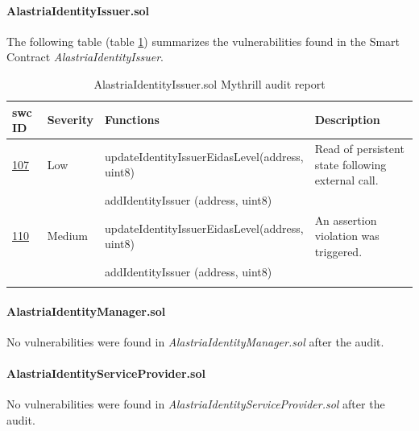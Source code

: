 \documentclass[a4paper, 12pt]{article} %
\begin{document}
            \paragraph{AlastriaIdentityIssuer.sol}
                The following table (table \ref{tab:AlastriaIdentityIssuer}) summarizes the vulnerabilities found in the Smart Contract \textit{AlastriaIdentityIssuer}.
                \begin{longtable}{||p{0.1\linewidth} | p{0.11\linewidth} | p{0.45\linewidth} | p{0.35\linewidth}||}
                    \hline
                    \textbf{\acrshort{swc} ID} & \textbf{Severity} & \textbf{Functions} & \textbf{Description} \\ [0.5ex] 
                    \hline\hline
                    \href{https://swcregistry.io/docs/SWC-107}{107} & Low & updateIdentityIssuerEidasLevel\newline (address, uint8) & Read of persistent state following external call.\\
                    \cline{3-3}
                    & & addIdentityIssuer (address, uint8) &\\[1ex]
                    \hline
                    \href{https://swcregistry.io/docs/SWC-110}{110} & Medium & updateIdentityIssuerEidasLevel\newline (address, uint8) & An assertion violation was triggered.\\
                    \cline{3-3}
                    & & addIdentityIssuer (address, uint8) &\\
                    \cline{3-3}
                    \hline
                    \caption{AlastriaIdentityIssuer.sol Mythrill audit report}
                    \label{tab:AlastriaIdentityIssuer}
                \end{longtable}
                
            \paragraph{AlastriaIdentityManager.sol}
                No vulnerabilities were found in \textit{AlastriaIdentityManager.sol} after the audit.
                
            \paragraph{AlastriaIdentityServiceProvider.sol}
                No vulnerabilities were found in \textit{AlastriaIdentityServiceProvider.sol} after the audit.
                
\end{document}
